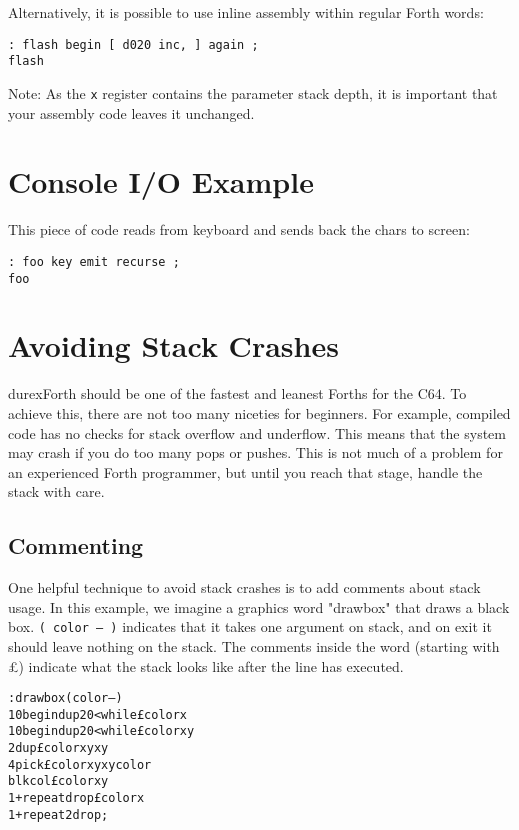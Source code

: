 Alternatively, it is possible to use inline assembly within regular Forth words:

\begin{verbatim}
: flash begin [ d020 inc, ] again ;
flash
\end{verbatim}

Note: As the \texttt{x} register contains the parameter stack depth, it is important that your assembly code leaves it unchanged.

\section{Console I/O Example}

This piece of code reads from keyboard and sends back the chars to screen:

\begin{verbatim}
: foo key emit recurse ;
foo
\end{verbatim}

\section{Avoiding Stack Crashes}

durexForth should be one of the fastest and leanest Forths for the C64. To achieve this, there are
not too many niceties for beginners. For example, compiled code has no checks for stack overflow
and underflow. This means that the system may crash if you do too many pops or pushes. This is not
much of a problem for an experienced Forth programmer, but until you reach that stage, handle the
stack with care.

\subsection{Commenting}

One helpful technique to avoid stack crashes is to add comments about stack usage.
In this example, we imagine a graphics word "drawbox" that draws a black box.
\texttt{( color -- )} indicates that it takes one argument on stack, and on exit it should
leave nothing on the stack. The comments inside the word (starting with \pounds) indicate what the stack
looks like after the line has executed.

\begin{alltt}
: drawbox ( color -- )
10 begin dup 20 < while \pounds color x
10 begin dup 20 < while \pounds color x y
2dup \pounds color x y x y
4 pick \pounds color x y x y color
blkcol \pounds color x y
1+ repeat drop \pounds color x
1+ repeat 2drop ;
\end{alltt}

